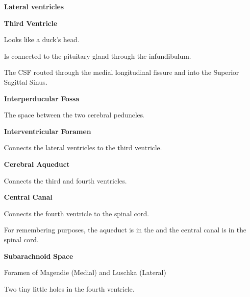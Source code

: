 \begin{coloredlist}
    \item \textbf{Lateral ventricles}
    \begin{coloredlist}
        \item
    \end{coloredlist}
    \item \textbf{Third Ventricle}
    \begin{coloredlist}
        \item Looks like a duck's head.
        \item Is connected to the pituitary gland through the infundibulum.
    \end{coloredlist}
    \item The CSF routed through the medial longitudinal fissure and into the Superior Sagittal Sinus.
    \item \textbf{Interperducular Fossa}
    \begin{coloredlist}
        \item The space between the two cerebral peduncles.
    \end{coloredlist}
    \item \textbf{Interventricular Foramen}
    \begin{coloredlist}
        \item Connects the lateral ventricles to the third ventricle.
    \end{coloredlist}
    \item \textbf{Cerebral Aqueduct}
    \begin{coloredlist}
        \item Connects the third and fourth ventricles.
    \end{coloredlist}
    \item \textbf{Central Canal}
    \begin{coloredlist}
        \item Connects the fourth ventricle to the spinal cord.
        \item For remembering purposes, the  aqueduct is in the  and the central canal is in the spinal cord.
    \end{coloredlist}
    \item \textbf{Subarachnoid Space}
    \begin{coloredlist}
        \item Foramen of Magendie (Medial) and Luschka (Lateral)
        \begin{coloredlist}
            \item Two tiny little holes in the fourth ventricle.
        \end{coloredlist}
    \end{coloredlist}
\end{coloredlist}

